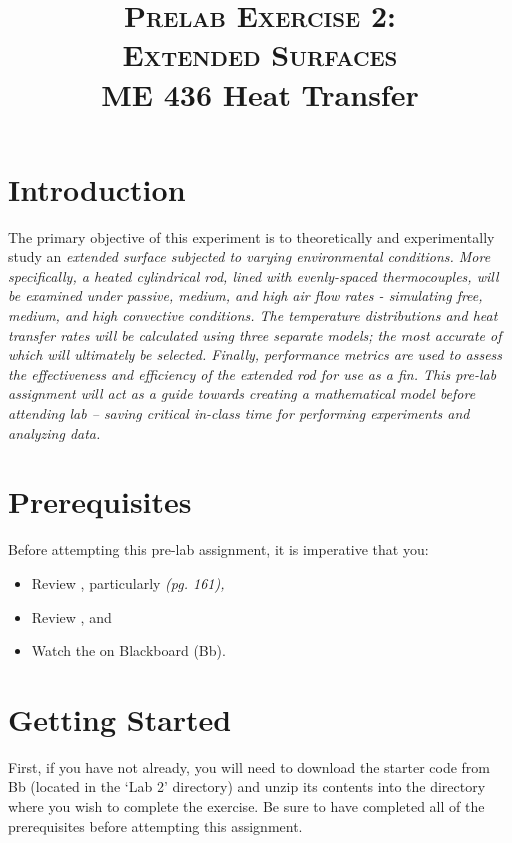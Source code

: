 \documentclass[11pt, letterpaper]{article}
\title{ \textsc{Prelab Exercise 2: \\ Extended Surfaces} \\ {\large  \color{darkgray} ME 436 Heat Transfer}}
\begin{document}
\date{}
\maketitle
\thispagestyle{firstpage} 




\section*{Introduction}

The primary objective of this experiment is to theoretically and experimentally study an \it{extended surface} subjected to varying environmental conditions. More specifically, a heated cylindrical rod, lined with evenly-spaced thermocouples,  will be examined under passive, medium, and high air flow rates - simulating free, medium, and high convective conditions. The temperature distributions and heat transfer rates will be calculated using three separate models; the most accurate of which will ultimately be selected. Finally, performance metrics are used to assess the effectiveness and efficiency of the extended rod for use as a fin.
\n
This pre-lab assignment will act as a guide towards creating a mathematical model before attending lab --  saving critical in-class time for performing experiments and analyzing data. 

\section*{Prerequisites}
Before attempting this pre-lab assignment, it is imperative that you:
{\small
\begin{itemize}
    \item Review , particularly  \it{(pg. 161)},
    \item Review , and
    \item Watch the  on Blackboard (Bb).
\end{itemize}
}

\section*{Getting Started}
First, if you have not already, you will need to download the starter code from Bb (located in the `Lab 2' directory) and unzip its contents into the directory where you wish to complete the exercise. Be sure to have completed all of the prerequisites before attempting this assignment.
\end{document}
